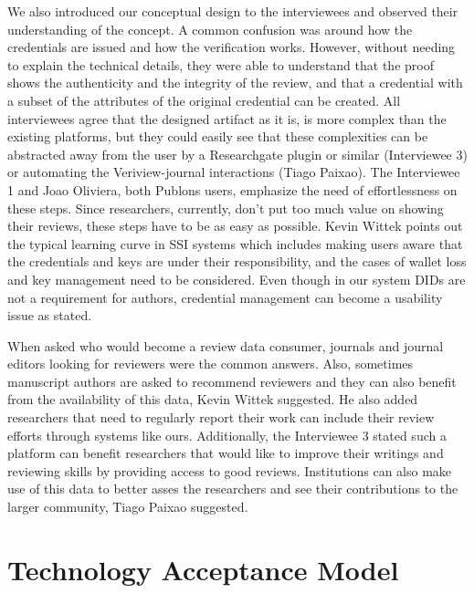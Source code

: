We also introduced our conceptual design to the interviewees and observed their understanding of the concept. A common confusion was around how the credentials are issued and how the verification works. However, without needing to explain the technical details, they were able to understand that the proof shows the authenticity and the integrity of the review, and that a credential with a subset of the attributes of the original credential can be created. All interviewees agree that the designed artifact as it is, is more complex than the existing platforms, but they could easily see that these complexities can be abstracted away from the user by a Researchgate plugin or similar (Interviewee 3) or automating the Veriview-journal interactions (Tiago Paixao). The Interviewee 1 and Joao Oliviera, both Publons users, emphasize the need of effortlessness on these steps. Since researchers, currently, don't put too much value on showing their reviews, these steps have to be as easy as possible. Kevin Wittek points out the typical learning curve in \acrshort{SSI} systems which includes making users aware that the credentials and keys are under their responsibility, and the cases of wallet loss and key management need to be considered. Even though in our system \acrshort{DID}s are not a requirement for authors, credential management can become a usability issue as stated. 

When asked who would become a review data consumer, journals and journal editors looking for reviewers were the common answers. Also, sometimes manuscript authors are asked to recommend reviewers and they can also benefit from the availability of this data, Kevin Wittek suggested. He also added researchers that need to regularly report their work can include their review efforts through systems like ours. Additionally, the Interviewee 3 stated such a platform can benefit researchers that would like to improve their writings and reviewing skills by providing access to good reviews. Institutions can also make use of this data to better asses the researchers and see their contributions to the larger community, Tiago Paixao suggested.

\section{Technology Acceptance Model}

